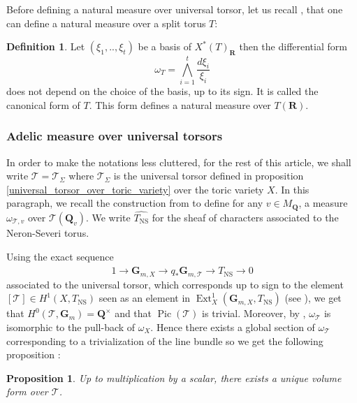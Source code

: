 \documentclass{proc-l}
\newcommand{\R}{\mathbf{R}}
\newcommand{\Q}{\mathbf{Q}}
\newcommand{\G}{\mathbf{G}}
\DeclareMathOperator{\Pic}{Pic}
\DeclareMathOperator{\Ext}{Ext}
\DeclareMathOperator{\NS}{NS}
\newcommand{\stackT}{\mathcal{T}}
\newcommand{\w}{\omega}
\newtheorem{prop}[theorem]{Proposition}
\theoremstyle{definition}
\newtheorem{definition}[theorem]{Definition}
\theoremstyle{remark}
\numberwithin{equation}{section}
\begin{document}
Before defining a natural measure over universal torsor, let us recall \cite[definition 3.1.2]{peyre_zeta_height_function}, that one can define a natural measure over a split torus $T$:

\begin{definition}\label{mesure_sur_un_tore}
    Let $(\xi_1,..,\xi_t) $ be a basis of $X^*(T)_{\R}$ then the differential form $$ \w_{T} = \bigwedge\limits_{i = 1}^t \frac{d \xi_i}{\xi_i}$$does not depend on the choice of the basis, up to its sign. It is called the canonical form of $T$. This form defines a natural measure over $ T(\R)$.
\end{definition}


\subsubsection{Adelic measure over universal torsors}

In order to make the notations less cluttered, for the rest of this article, we shall write $\stackT = \stackT_{\Sigma}$ where $\stackT_{\Sigma}$ is the universal torsor defined in proposition \ref{universal_torsor_over_toric_variety} over the toric variety $X$. In this paragraph, we recall the construction from \cite[section 4.3.2]{Peyre_beyond_height} to define for any $v \in M_{\Q}$, a measure $\w_{\stackT,v}$ over $\stackT(\Q_v)$. We write $\widehat{T_{\NS}}$ for the sheaf of characters associated to the Neron-Severi torus.


Using the exact sequence $$ 1 \rightarrow \G_{m,X} \rightarrow q_* \G_{m,\stackT} \rightarrow \widehat{T_{\NS}} \rightarrow 0$$ associated to the universal torsor, which corresponds up to sign to the element  $[\stackT] \in H^1(X,T_{\NS}) $ seen as an element in $\Ext^1_X(\G_{m,X},T_{\NS})$ (see \cite[1.4.3]{ColliotTheleneSansuc1987}), we get that $H^0(\stackT,\G_m) = \Q^{\times}$ and that $\Pic(\stackT)$ is trivial. Moreover, by \cite[lemme 2.1.10]{methode_du_cercle_peyre}, $\w_{\stackT}$ is isomorphic to the pull-back of $\w_X$. Hence there exists a global section of $\w_{\stackT}$ corresponding to a trivialization of the line bundle so we get the following proposition \cite[proposition 4.24]{Peyre_beyond_height}:

\begin{prop}
   Up to multiplication by a scalar, there exists a unique volume form over $\stackT$.
\end{prop}
\end{document}
